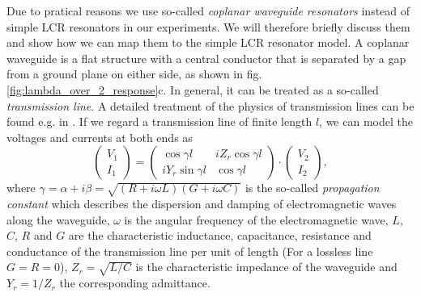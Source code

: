 Due to pratical reasons we use so-called {\it coplanar waveguide resonators} instead of simple LCR resonators in our experiments. We will therefore briefly discuss them and show how we can map them to the simple LCR resonator model. A coplanar waveguide is a flat structure with a central conductor that is separated by a gap from a ground plane on either side, as shown in fig. \ref{fig:lambda_over_2_response}c. In general, it can be treated as a so-called {\it transmission line}. A detailed treatment of the physics of transmission lines can be found e.g. in \cite{pozar_microwave_2011}.  If we regard a transmission line of finite length $l$, we can model the voltages and currents at both ends as \citep{pozar_microwave_2011}
%
\begin{equation}
\left( \begin{array}{c} V_1 \\ I_1 \end{array}\right) = \left( 
		\begin{array}{cc}
			\cos{\gamma l} & iZ_r \cos{\gamma l} \\
			i Y_r \sin{\gamma l} & \cos{\gamma l}
		\end{array}
		\right) \cdot \left(
		\begin{array}{c}
			V_2 \\ I_2
		\end{array}
		\right), \label{eq:cpw_abcd_matrix}
\end{equation}
%
where $\gamma = \alpha+i\beta = \sqrt{(R+i\omega L)(G+i\omega C)}$ is the so-called {\it propagation constant} which describes the dispersion and damping of electromagnetic waves along the waveguide, $\omega$ is the angular frequency of the electromagnetic wave, $L$, $C$, $R$ and $G$ are the characteristic inductance, capacitance, resistance and conductance of the transmission line per unit of length (For a lossless line $G=R=0$), $Z_r=\sqrt{L/C}$ is the characteristic impedance of the waveguide and $Y_r=1/Z_r$ the corresponding admittance. 

\smallskip

